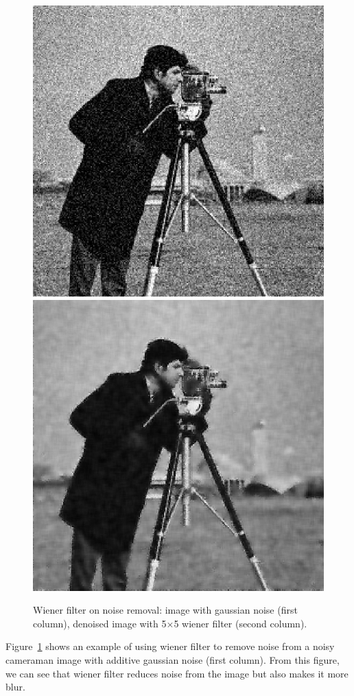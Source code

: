 \begin{figure}[tb]
\begin{center}
	\includegraphics[width=0.4\columnwidth]{images/gaussian_wiener_noise.jpg}
	\includegraphics[width=0.4\columnwidth]{images/gaussian_wiener_denoise.jpg}
	\caption{Wiener filter on noise removal: image with gaussian noise (first column), denoised image with 5$\times$5 wiener filter (second column).}	
	\label{fig:wienerfilter}
\end{center}
\end{figure}

Figure~\ref{fig:wienerfilter} shows an example of using wiener filter to remove noise from a noisy cameraman image with additive gaussian noise (first column). From this figure, we can see that wiener filter reduces noise from the image but also makes it more blur.


